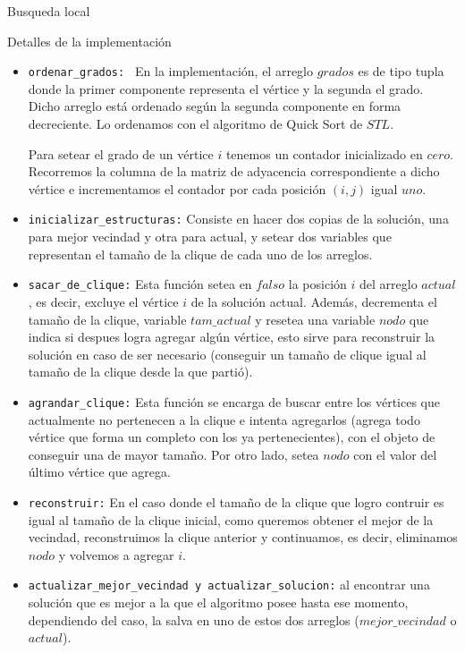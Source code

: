 \begin{section}{Busqueda local}
\begin{subsection}{Detalles de la implementación}
		\begin{itemize}
			\item \texttt{ordenar\_grados: } En la implementación, el arreglo $grados$ es de tipo tupla donde la primer componente representa el vértice y la segunda el grado. Dicho arreglo está ordenado según la segunda componente en forma decreciente. Lo ordenamos con el algoritmo de Quick Sort de $STL$.
				
			Para setear el grado de un vértice $i$ tenemos un contador inicializado en $cero$. Recorremos la columna de la matriz de adyacencia correspondiente a dicho vértice e incrementamos el contador por cada posición $(i,j)$ igual $uno$.
			
			\item \texttt{inicializar\_estructuras:} Consiste en hacer dos copias de la solución, una para mejor vecindad y otra para actual, y setear dos variables que representan el tamaño de la clique de cada uno de los arreglos.
		
			\item \texttt{sacar\_de\_clique:} Esta función setea en $falso$ la posición $i$ del arreglo $actual$, es decir, excluye el vértice $i$ de la solución actual. Además, decrementa el tamaño de la clique, variable $tam\_actual$ y resetea una variable $nodo$ que indica si despues logra agregar algún vértice, esto sirve para reconstruir la solución en caso de ser necesario (conseguir un tamaño de clique igual al tamaño de la clique desde la que partió).

			\item \texttt{agrandar\_clique:} Esta función se encarga de buscar entre los vértices que actualmente no pertenecen a la clique e intenta agregarlos (agrega todo vértice que forma un completo con los ya pertenecientes), con el objeto de conseguir una de mayor tamaño. Por otro lado, setea $nodo$ con el valor del último vértice que agrega.

			\item \texttt{reconstruir:} En el caso donde el tamaño de la clique que logro contruir es igual al tamaño de la clique inicial, como queremos obtener el mejor de la vecindad, reconstruimos la clique anterior y continuamos, es decir, eliminamos $nodo$ y volvemos a agregar $i$.
			
			\item \texttt{actualizar\_mejor\_vecindad y actualizar\_solucion:} al encontrar una solución que es mejor a la que el algoritmo posee hasta ese momento, dependiendo del caso, la salva en uno de estos dos arreglos ($mejor\_vecindad$ o $actual$).
			

\end{itemize}
\end{subsection}
\end{section}
